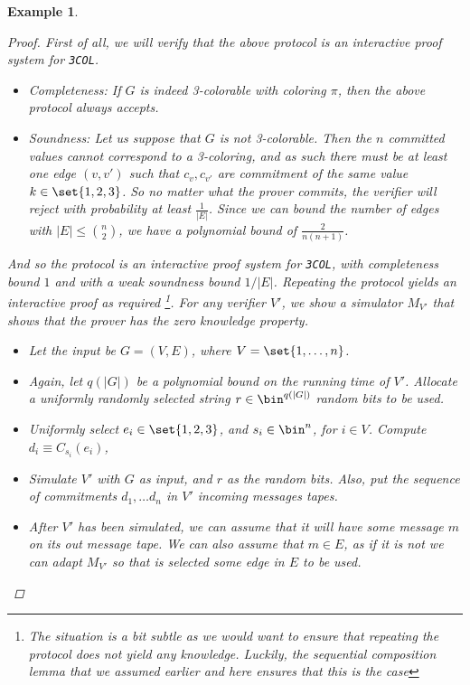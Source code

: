 \documentclass{article}
\newtheorem{example}{Example}
\begin{document}
\begin{example}
\begin{proof}
        First of all, we will verify that the above protocol is an interactive proof system for \texttt{3COL}.
        \begin{itemize}
            \item Completeness: If $G$ is indeed 3-colorable with coloring $\pi$, then the above protocol always accepts.
            \item Soundness: Let us suppose that $G$ is not 3-colorable. Then the $n$ committed values cannot
                  correspond to a 3-coloring, and as such there must be at least one edge $(v, v')$ such that
                  $c_v, c_{v'}$ are commitment of the same value $k \in \set{1, 2, 3}$. So no matter what the
                  prover commits, the verifier will reject with probability at least $\frac{1}{|E|}$. Since we can bound
                  the number of edges with $|E| \leq \binom{n}{2}$, we have a polynomial bound of $\frac{2}{n(n+1)}$.
        \end{itemize}
        And so the protocol is an interactive proof system for \texttt{3COL}, with completeness bound $1$ and
        with a weak soundness bound $1/|E|$. Repeating the protocol yields an interactive proof as required
        \footnote{The situation is a bit subtle as we would want to ensure that repeating the protocol does not yield any knowledge.
            Luckily, the sequential composition lemma that we assumed earlier and here ensures that this is the case}.
        For any verifier $V'$, we show a simulator $M_{V'}$ that shows that the prover has the zero knowledge property.
        \begin{itemize}
            \item Let the input be $G = (V, E)$, where $V = \set{1, \dots, n }$.
            \item Again, let $q(|G|)$ be a polynomial bound on the running time of $V'$. Allocate a uniformly randomly selected string $r \in \bin^{q(|G|)}$ random bits to be used.
            \item Uniformly select $e_i \in \set{1, 2, 3}$, and $s_i \in \bin^n$, for $i \in V$. Compute $d_i \equiv C_{s_i}(e_i)$,
            \item Simulate $V'$ with $G$ as input, and $r$ as the random bits. Also, put the sequence of commitments $d_1, \dots d_n$ in $V'$ incoming messages tapes.
            \item After $V'$ has been simulated, we can assume that it will have some message $m$ on its out message tape. We can also
                  assume that $m \in E$, as if it is not we can adapt $M_{V'}$ so that is selected some edge in $E$ to be used.

\end{itemize}
\end{proof}
\end{example}
\end{document}
